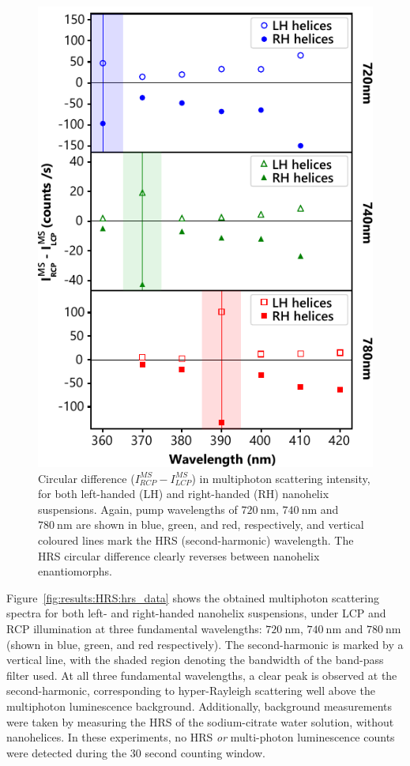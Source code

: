 \begin{figure}[htb!]	
    \centering	
    \includegraphics[scale=1]{./figures/results/HRS/hrs_cd_data.pdf}
    \caption{\label{fig:results:HRS:hrs_cd_data}
    Circular difference ($I_{RCP}^{MS}-I_{LCP}^{MS}$) in multiphoton scattering intensity, for both left-handed (LH) and right-handed (RH) nanohelix suspensions. Again, pump wavelengths of $\SI{720}{\nano\m}$, $\SI{740}{\nano\m}$ and $\SI{780}{\nano\m}$ are shown in blue, green, and red, respectively, and vertical coloured lines mark the HRS (second-harmonic) wavelength. The HRS circular difference clearly reverses between nanohelix enantiomorphs.}	
\end{figure}

Figure~\ref{fig:results:HRS:hrs_data} shows the obtained multiphoton scattering spectra for both left- and right-handed nanohelix suspensions, under LCP and RCP illumination at three fundamental wavelengths: $\SI{720}{\nano\m}$, $\SI{740}{\nano\m}$ and $\SI{780}{\nano\m}$ (shown in blue, green, and red respectively). 
The second-harmonic is marked by a vertical line, with the shaded region denoting the bandwidth of the band-pass filter used. At all three fundamental wavelengths, a clear peak is observed at the second-harmonic, corresponding to hyper-Rayleigh scattering well above the multiphoton luminescence background. Additionally, background measurements were taken by measuring the HRS of the sodium-citrate water solution, without nanohelices. In these experiments, no HRS \textit{or} multi-photon luminescence counts were detected during the 30 second counting window.

